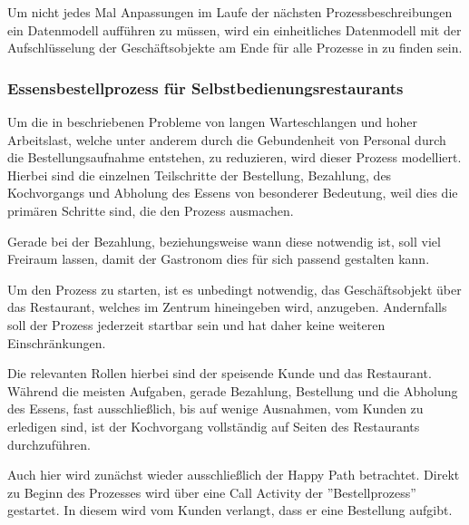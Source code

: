Um nicht jedes Mal Anpassungen im Laufe der nächsten Prozessbeschreibungen ein Datenmodell aufführen zu müssen, wird ein einheitliches Datenmodell mit der Aufschlüsselung der Geschäftsobjekte am Ende für alle Prozesse in  zu finden sein.

\subsubsection{Essensbestellprozess für Selbstbedienungsrestaurants}
\label{sec:selbstbedienungsrestaurantunterprozess}
Um die in  beschriebenen Probleme von langen Warteschlangen und hoher Arbeitslast, welche unter anderem durch die Gebundenheit von Personal durch die Bestellungsaufnahme entstehen, zu reduzieren, wird dieser Prozess modelliert. Hierbei sind die einzelnen Teilschritte der Bestellung, Bezahlung, des Kochvorgangs und Abholung des Essens von besonderer Bedeutung, weil dies die primären Schritte sind, die den Prozess ausmachen.

Gerade bei der Bezahlung, beziehungsweise wann diese notwendig ist, soll viel Freiraum lassen, damit der Gastronom dies für sich passend gestalten kann.

Um den Prozess zu starten, ist es unbedingt notwendig, das Geschäftsobjekt über das Restaurant, welches im Zentrum hineingeben wird, anzugeben. Andernfalls soll der Prozess jederzeit startbar sein und hat daher keine weiteren Einschränkungen.

Die relevanten Rollen hierbei sind der speisende Kunde und das Restaurant.
Während die meisten Aufgaben, gerade Bezahlung, Bestellung und die Abholung des Essens, fast ausschließlich, bis auf wenige Ausnahmen, vom Kunden zu erledigen sind, ist der Kochvorgang vollständig auf Seiten des Restaurants durchzuführen.

\clearpage
{}

Auch hier wird zunächst wieder ausschließlich der Happy Path betrachtet. Direkt zu Beginn des Prozesses wird über eine Call Activity der ''Bestellprozess'' gestartet. In diesem wird vom Kunden verlangt, dass er eine Bestellung aufgibt. 

